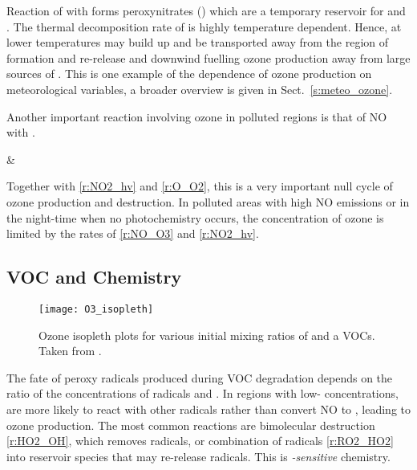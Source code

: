 Reaction of  with  forms peroxynitrates () which are a temporary reservoir for  and .
The thermal decomposition rate of  is highly temperature dependent.
Hence, at lower temperatures  may build up and be transported away from the region of formation and re-release  and  downwind fuelling ozone production away from large sources of .
This is one example of the dependence of ozone production on meteorological variables, a broader overview is given in Sect.~\ref{s:meteo_ozone}.

Another important reaction involving ozone in polluted regions is that of NO with .
\begin{rxnarray}
     & \rightarrow {} \label{r:NO_O3}
\end{rxnarray}
Together with \eqref{r:NO2_hv} and \eqref{r:O_O2}, this is a very important null cycle of ozone production and destruction.
In polluted areas with high NO emissions or in the night-time when no photochemistry occurs, the concentration of ozone is limited by the rates of \eqref{r:NO_O3} and \eqref{r:NO2_hv}.

\subsection[VOC and NOx Chemistry]{VOC and  Chemistry} \label{ss:VOC_NOx}
\begin{figure}
	\begin{center}
        \caption[Ozone mixing ratios as a function of  and VOC]{Ozone isopleth plots for various initial mixing ratios of  and a VOCs. Taken from \citet{Jenkin:2000}.}
        \texttt{[image: O3\_isopleth]}
		\label{f:O3_isopleth}
	\end{center}
\end{figure}
The fate of peroxy radicals produced during VOC degradation depends on the ratio of the concentrations of radicals and  \citep{Kleinman:1991, Kleinman:1994}.
In regions with low- concentrations,  are more likely to react with other radicals rather than convert NO to , leading to ozone production.
The most common reactions are bimolecular destruction \eqref{r:HO2_OH}, which removes radicals, or combination of radicals \eqref{r:RO2_HO2} into reservoir species that may re-release radicals.
This is \emph{-sensitive} chemistry.

